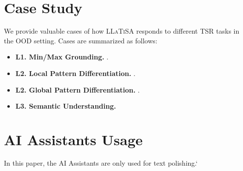 \documentclass[11pt]{article}
\begin{document}
\section{Case Study}
We provide valuable cases of how \textsc{LLaTiSA} responds to different TSR tasks in the OOD setting. Cases are summarized as follows:
\begin{itemize}[left=0pt]
\setlength{\itemsep}{0.5pt}
    \item \textbf{L1. Min/Max Grounding.} .
    \item \textbf{L2. Local Pattern Differentiation.} .
    \item \textbf{L2. Global Pattern Differentiation.} .
    \item \textbf{L3. Semantic Understanding.}
\end{itemize}

\section{AI Assistants Usage}
In this paper, the AI Assistants are only used for text polishing.‘
\end{document}
